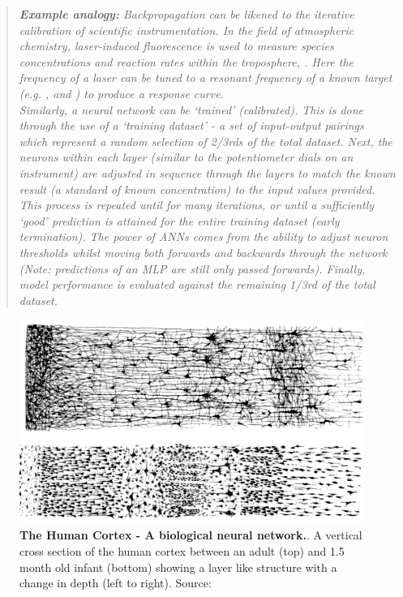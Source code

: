 \begin{quote}
\textit{
\textbf{Example analogy:} Backpropagation can be likened to the iterative calibration of scientific instrumentation. In the field of atmospheric chemistry, laser-induced fluorescence is used to measure species concentrations and reaction rates within the troposphere, \citep{lif1,lif2}. Here the frequency of a laser can be tuned to a resonant frequency of a known target (e.g. ,  and ) to produce a response curve.\\
Similarly, a neural network can be `trained' (calibrated).
This is done through the use of a `training dataset' - a set of input-output pairings which represent a random selection of 2/3rds of the total dataset. Next, the neurons within each layer (similar to the potentiometer dials on an instrument) are adjusted in sequence through the layers to match the known result (a standard of known concentration) to the input values provided. This process is repeated until for many iterations, or until a sufficiently `good' prediction is attained for the entire training dataset (early termination). The power of ANNs comes from the ability to adjust neuron thresholds whilst moving both forwards and backwards through the network (Note: predictions of an MLP are still only passed forwards). Finally, model performance is evaluated against the remaining 1/3rd of the total dataset.
}
\end{quote}


\begin{figure}[H]
     \centering
         \includegraphics[width=.85\textwidth]{figures_c3/mlpregressor/Cajal_cortex_drawings.png}
        \caption{\textbf{The Human Cortex - A biological neural network.}. A vertical cross section of the human cortex between an adult (top) and 1.5 month old infant (bottom) showing a layer like structure with a change in depth (left to right). Source: \cite{layercortex}}
        \label{fig:layercortex}
\end{figure}

